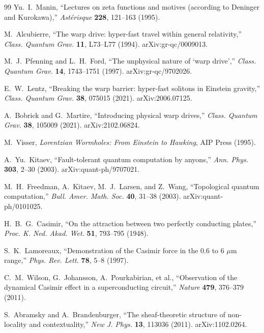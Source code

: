 \documentclass[12pt,a4paper]{ltjsarticle}
\theoremstyle{definition}
\begin{document}
\begin{thebibliography}{99}
Yu.~I.~Manin, ``Lectures on zeta functions and motives (according to Deninger and Kurokawa),'' \textit{Ast\'{e}risque} \textbf{228}, 121--163 (1995).

M.~Alcubierre, ``The warp drive: hyper-fast travel within general relativity,'' \textit{Class. Quantum Grav.} \textbf{11}, L73--L77 (1994). arXiv:gr-qc/0009013.

M.~J.~Pfenning and L.~H.~Ford, ``The unphysical nature of `warp drive','' \textit{Class. Quantum Grav.} \textbf{14}, 1743--1751 (1997). arXiv:gr-qc/9702026.

E.~W.~Lentz, ``Breaking the warp barrier: hyper-fast solitons in Einstein gravity,'' \textit{Class. Quantum Grav.} \textbf{38}, 075015 (2021). arXiv:2006.07125.

A.~Bobrick and G.~Martire, ``Introducing physical warp drives,'' \textit{Class. Quantum Grav.} \textbf{38}, 105009 (2021). arXiv:2102.06824.

M.~Visser, \textit{Lorentzian Wormholes: From Einstein to Hawking}, AIP Press (1995).

A.~Yu.~Kitaev, ``Fault-tolerant quantum computation by anyons,'' \textit{Ann. Phys.} \textbf{303}, 2--30 (2003). arXiv:quant-ph/9707021.

M.~H.~Freedman, A.~Kitaev, M.~J.~Larsen, and Z.~Wang, ``Topological quantum computation,'' \textit{Bull. Amer. Math. Soc.} \textbf{40}, 31--38 (2003). arXiv:quant-ph/0101025.

H.~B.~G.~Casimir, ``On the attraction between two perfectly conducting plates,'' \textit{Proc. K. Ned. Akad. Wet.} \textbf{51}, 793--795 (1948).

S.~K.~Lamoreaux, ``Demonstration of the Casimir force in the 0.6 to 6 $\mu$m range,'' \textit{Phys. Rev. Lett.} \textbf{78}, 5--8 (1997).

C.~M.~Wilson, G.~Johansson, A.~Pourkabirian, et al., ``Observation of the dynamical Casimir effect in a superconducting circuit,'' \textit{Nature} \textbf{479}, 376--379 (2011).


S.~Abramsky and A.~Brandenburger, ``The sheaf-theoretic structure of non-locality and contextuality,'' \textit{New J. Phys.} \textbf{13}, 113036 (2011). arXiv:1102.0264.


\end{thebibliography}
\end{document}
